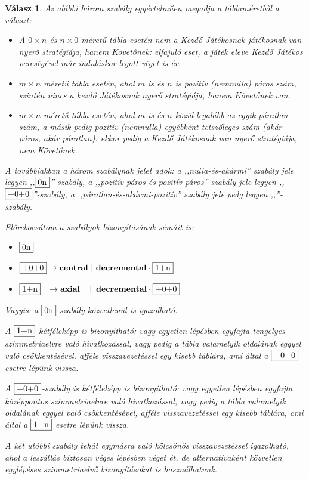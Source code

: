 \documentclass{article}
\newtheorem*{answer}{Válasz}
\begin{document}
		\begin{answer}
			Az alábbi három szabály egyértelműen megadja a táblaméretből a választ:
			\begin{itemize}
				\item
				A $0\times n$ és $n\times0$ méretű tábla esetén nem a Kezdő Játékosnak játékosnak van nyerő stratégiája, hanem Követőnek:
				elfajuló eset, a játék eleve Kezdő Játékos vereségével már induláskor legott véget is ér.
				\item
				$m\times n$ méretű tábla esetén, ahol $m$ is és $n$ is pozitív (nemnulla) páros szám, szintén nincs a kezdő Játékosnak nyerő stratégiája,  hanem Követőnek van.
				\item
				$m\times n$ méretű tábla esetén, ahol $m$ is és $n$ közül legalább az egyik páratlan szám, a másik pedig pozitív (nemnulla) egyébként tetszőleges szám (akár páros, akár páratlan): ekkor pedig a Kezdő Játékosnak van nyerő stratégiája, nem Követőnek.
			\end{itemize}
			A továbbiakban a három szabálynak jelet adok: a ,,nulla-és-akármi'' szabály jele legyen ,,$\fbox{0n}$''-szabály, a ,,pozitív-páros-és-pozitív-páros'' szabály jele legyen ,,$\fbox{+0+0}$''-szabály, a ,,páratlan-és-akármi-pozitív'' szabály jele pedg legyen ,,''-szabály.

			Előrebocsátom a szabályok bizonyításának sémáit is:
			\begin{itemize}
				\item $\fbox{0n}$
				\item $\fbox{+0+0} \to \mathbf{central}\,\,|\,\,\mathbf{decremental} \cdot \fbox{1+n}$
				\item $\fbox{1+n} \,\,\,\,\,\to \mathbf{axial}\,\,\,\,\,\,\,|\,\,\,\mathbf{decremental} \cdot \fbox{+0+0}$
			\end{itemize}
			Vagyis: a $\fbox{0n}$-szabály közvetlenül is igazolható.

			A $\fbox{1+n}$ kétféleképp is bizonyítható: vagy egyetlen lépésben egyfajta tengelyes szimmetriaelvre való hivatkozással, vagy pedig a tábla valamelyik oldalának eggyel való csökkentésével, afféle visszavezetéssel egy kisebb táblára, ami által a $\fbox{+0+0}$ esetre lépünk vissza.

			A $\fbox{+0+0}$-szabály is kétféleképp is bizonyítható: vagy egyetlen lépésben egyfajta középpontos szimmetriaelvre való hivatkozással, vagy pedig a tábla valamelyik oldalának eggyel való csökkentésével, afféle visszavezetéssel egy kisebb táblára, ami által a $\fbox{1+n}$ esetre lépünk vissza.

			A két utóbbi szabály tehát egymásra való kölcsönös visszavezetéssel igazolható, ahol a leszállás biztosan véges lépésben véget ét, de alternatívaként közvetlen egylépéses szimmetriaelvű bizonyításokat is használhatunk.
		\end{answer}
\end{document}
